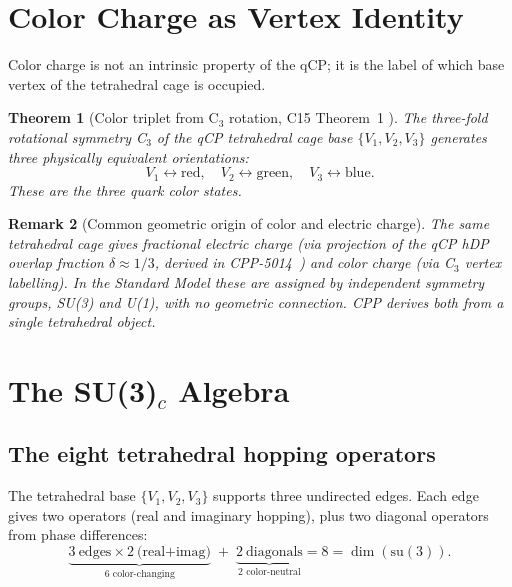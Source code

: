 \documentclass[11pt,a4paper]{article}
\newtheorem{theorem}{Theorem}[section]
\newtheorem{remark}[theorem]{Remark}
\begin{document}
\section{Color Charge as Vertex Identity}
\label{sec:color}

Color charge is not an intrinsic property of the qCP; it is the
label of which base vertex of the tetrahedral cage is occupied.

\begin{theorem}[Color triplet from C$_3$ rotation, C15 Theorem~1 \citep{c15}]
\label{thm:color_triplet}
The three-fold rotational symmetry C$_3$ of the qCP tetrahedral
cage base $\{V_1, V_2, V_3\}$ generates three physically equivalent
orientations:
\begin{equation}
V_1 \leftrightarrow \text{red},\quad
V_2 \leftrightarrow \text{green},\quad
V_3 \leftrightarrow \text{blue}.
\label{eq:color_assign}
\end{equation}
These are the three quark color states.
\end{theorem}

\begin{remark}[Common geometric origin of color and electric charge]
The same tetrahedral cage gives fractional electric charge (via
projection of the qCP hDP overlap fraction $\delta \approx 1/3$,
derived in CPP-5014~\citep{cpp5014}) and color charge (via
C$_3$ vertex labelling).  In the Standard Model these are assigned
by independent symmetry groups, SU(3) and U(1), with no geometric
connection.  CPP derives both from a single tetrahedral object.
\end{remark}

\section{The SU(3)$_c$ Algebra}
\label{sec:su3}

\subsection{The eight tetrahedral hopping operators}

The tetrahedral base $\{V_1, V_2, V_3\}$ supports three undirected
edges.  Each edge gives two operators (real and imaginary hopping),
plus two diagonal operators from phase differences:
\begin{equation}
\underbrace{3\ \text{edges}\times2\ \text{(real+imag)}}_{\text{6 color-changing}}
\;+\;\underbrace{2\ \text{diagonals}}_{\text{2 color-neutral}}
= 8 = \dim(\mathrm{su}(3)).
\label{eq:count}
\end{equation}
\end{document}

